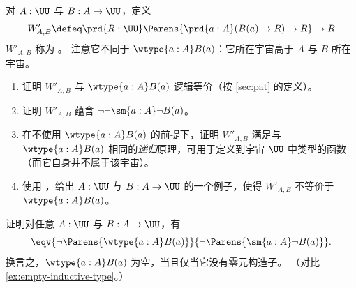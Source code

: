 \begin{ex}\label{ex:Wimpred}
  对 $A:\UU$ 与 $B:A\to \UU$，定义
  \[ W'_{A,B} \defeq \prd{R:\UU} \Parens{\prd{a:A} (B(a) \to R) \to R} \to R \]
  $W'_{A,B}$ 称为 。
  注意它不同于 $\wtype{a:A} B(a)$：它所在宇宙高于 $A$ 与 $B$ 所在宇宙。
  \begin{enumerate}
  \item 证明 $W'_{A,B}$ 与 $\wtype{a:A} B(a)$ 逻辑等价（按 \cref{sec:pat} 的定义）。
  \item 证明 $W'_{A,B}$ 蕴含 $\neg\neg \sm{a:A} \neg B(a)$。
  \item 在不使用 $\wtype{a:A} B(a)$ 的前提下，证明 $W'_{A,B}$ 满足与 $\wtype{a:A} B(a)$ 相同的\emph{递归}原理，可用于定义到宇宙 $\UU$ 中类型的函数（而它自身并不属于该宇宙）。
  \item 使用 \LEM，给出 $A:\UU$ 与 $B:A\to \UU$ 的一个例子，使得 $W'_{A,B}$ 不等价于 $\wtype{a:A} B(a)$。
  \end{enumerate}
\end{ex}

\begin{ex}\label{ex:no-nullary-constructor}
  证明对任意 $A:\UU$ 与 $B:A\to\UU$，有
  \[ \eqv{\neg\Parens{\wtype{a:A} B(a)}}{\neg\Parens{\sm{a:A} \neg B(a)}}. \]
  换言之，$\wtype{a:A} B(a)$ 为空，当且仅当它没有零元构造子。
  （对比 \cref{ex:empty-inductive-type}。）
\end{ex}

